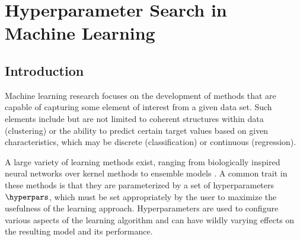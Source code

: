 \chapter{Hyperparameter Search in Machine Learning} \label{ch:mic2015}

\clearpage


\section{Introduction}
Machine learning research focuses on the development of methods that are capable of capturing some element of interest from a given data set. Such elements include but are not limited to coherent structures within data (clustering) or the ability to predict certain target values based on given characteristics, which may be discrete (classification) or continuous (regression). %

A large variety of learning methods exist, ranging from biologically inspired neural networks \citep{bishop1995neural} over kernel methods \citep{scholkopf2002learning} to ensemble models \citep{breiman2001random, ensemblesvm-jmlr}. A common trait in these methods is that they are parameterized by a set of hyperparameters $\hyperpars$, which must be set appropriately by the user to maximize the usefulness of the learning approach. Hyperparameters are used to configure various aspects of the learning algorithm and can have wildly varying effects on the resulting model and its performance. 


